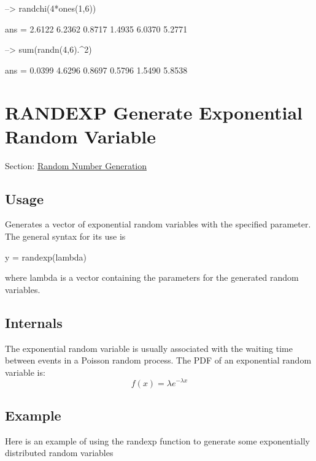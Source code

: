 \begin{DoxyVerbInclude}
--> randchi(4*ones(1,6))

ans = 
    2.6122    6.2362    0.8717    1.4935    6.0370    5.2771 

--> sum(randn(4,6).^2)

ans = 
    0.0399    4.6296    0.8697    0.5796    1.5490    5.8538 
\end{DoxyVerbInclude}
 \hypertarget{random_randexp}{}\section{R\-A\-N\-D\-E\-X\-P Generate Exponential Random Variable}\label{random_randexp}
Section\-: \hyperlink{sec_random}{Random Number Generation} \hypertarget{vtkwidgets_vtkxyplotwidget_Usage}{}\subsection{Usage}\label{vtkwidgets_vtkxyplotwidget_Usage}
Generates a vector of exponential random variables with the specified parameter. The general syntax for its use is \begin{DoxyVerb}   y = randexp(lambda)
\end{DoxyVerb}
 where {\ttfamily lambda} is a vector containing the parameters for the generated random variables. \hypertarget{transforms_svd_Function}{}\subsection{Internals}\label{transforms_svd_Function}
The exponential random variable is usually associated with the waiting time between events in a Poisson random process. The P\-D\-F of an exponential random variable is\-: \[ f(x) = \lambda e^{-\lambda x} \] \hypertarget{variables_struct_Example}{}\subsection{Example}\label{variables_struct_Example}
Here is an example of using the {\ttfamily randexp} function to generate some exponentially distributed random variables


